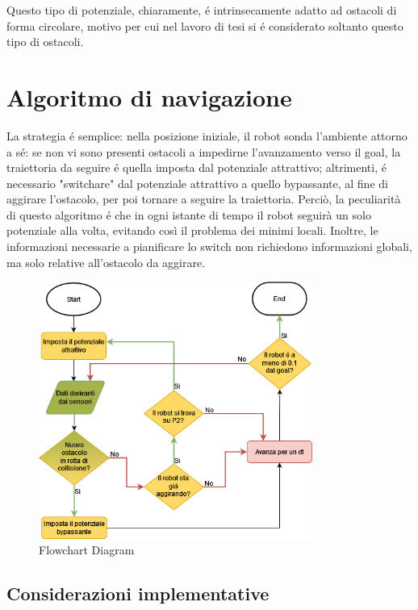 \documentclass[14pt,a4paper]{extarticle}
\begin{document}
Questo tipo di potenziale, chiaramente, é intrinsecamente adatto ad ostacoli di forma circolare, motivo per cui nel lavoro di tesi si é considerato soltanto questo tipo di ostacoli.

\section{Algoritmo di navigazione\cite{dalfonso}} 
La strategia é semplice: nella posizione iniziale, il robot sonda l'ambiente attorno a sé: se non vi sono presenti ostacoli a impedirne l'avanzamento verso il goal, la traiettoria da seguire é quella imposta dal potenziale attrattivo; altrimenti, é necessario "switchare" dal potenziale attrattivo a quello bypassante, al fine di aggirare l'ostacolo, per poi tornare a seguire la traiettoria. Perciò, la peculiarità di questo algoritmo é che in ogni istante di tempo il robot seguirà un solo potenziale alla volta, evitando così il problema dei minimi locali. Inoltre, le informazioni necessarie a pianificare lo switch non richiedono informazioni globali, ma solo relative all'ostacolo da aggirare. 

\begin{figure}[H]
\caption{Flowchart Diagram} \label{flow}
\centering
\includegraphics[width=0.8\textwidth]{flowchart.png}
\end{figure}

\subsection{Considerazioni implementative}
\end{document}
